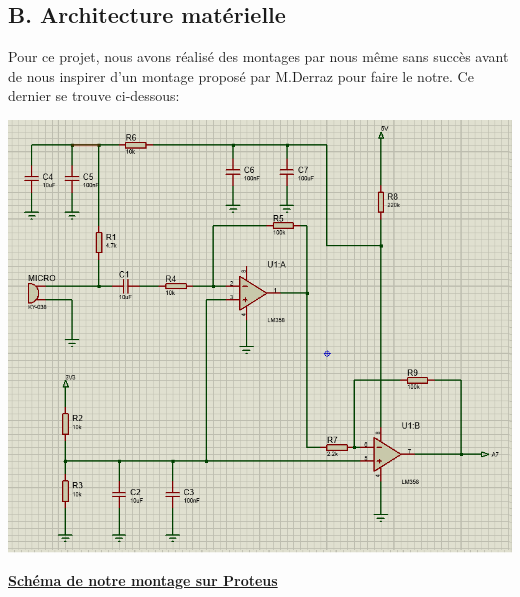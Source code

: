 \documentclass[a4paper,11pt]{book}
\begin{document}
\vspace{3mm}
\subsection*{B. Architecture matérielle}
Pour ce projet, nous avons réalisé des montages par nous même sans succès avant de nous inspirer d'un montage proposé par M.Derraz pour faire le notre. Ce dernier se trouve ci-dessous:

\includegraphics[width=\textwidth]{template_PRJ_TEX_FR/montageprojet.png} \\
\begin{center} \underline{\textbf{Schéma de notre montage sur Proteus}} 
\end{center}
\end{document}
